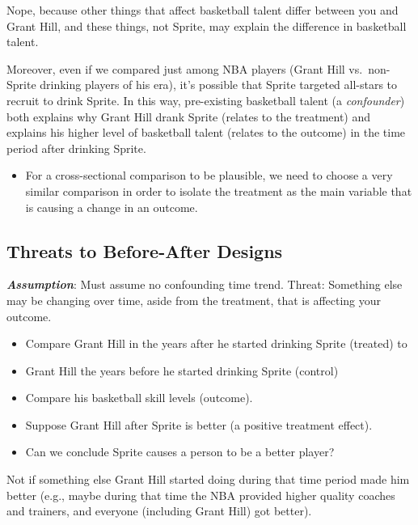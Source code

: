 \documentclass[
  letterpaper,
  DIV=11,
  numbers=noendperiod]{scrreprt}
\providecommand{\tightlist}{%
  \setlength{\itemsep}{0pt}\setlength{\parskip}{0pt}}\usepackage{longtable,booktabs,array}
\begin{document}
Nope, because other things that affect basketball talent differ between
you and Grant Hill, and these things, not Sprite, may explain the
difference in basketball talent.

Moreover, even if we compared just among NBA players (Grant Hill
vs.~non-Sprite drinking players of his era), it's possible that Sprite
targeted all-stars to recruit to drink Sprite. In this way, pre-existing
basketball talent (a \emph{confounder}) both explains why Grant Hill
drank Sprite (relates to the treatment) and explains his higher level of
basketball talent (relates to the outcome) in the time period after
drinking Sprite.

\begin{itemize}
\tightlist
\item
  For a cross-sectional comparison to be plausible, we need to choose a
  very similar comparison in order to isolate the treatment as the main
  variable that is causing a change in an outcome.
\end{itemize}

\hypertarget{threats-to-before-after-designs}{%
\subsection{Threats to Before-After
Designs}\label{threats-to-before-after-designs}}

\textbf{\emph{Assumption}}: Must assume no confounding time trend.
Threat: Something else may be changing over time, aside from the
treatment, that is affecting your outcome.

\begin{itemize}
\tightlist
\item
  Compare Grant Hill in the years after he started drinking Sprite
  (treated) to
\item
  Grant Hill the years before he started drinking Sprite (control)
\item
  Compare his basketball skill levels (outcome).
\item
  Suppose Grant Hill after Sprite is better (a positive treatment
  effect).
\item
  Can we conclude Sprite causes a person to be a better player?
\end{itemize}

Not if something else Grant Hill started doing during that time period
made him better (e.g., maybe during that time the NBA provided higher
quality coaches and trainers, and everyone (including Grant Hill) got
better).
\end{document}
